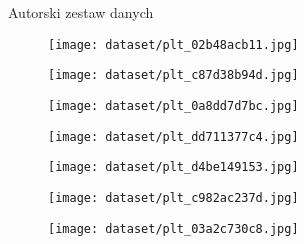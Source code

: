 \begin{easyappendix}{Autorski zestaw danych}
\begin{figure}[H]
        \centering
        \texttt{[image: dataset/plt\_02b48acb11.jpg]}
    \end{figure}
    \begin{figure}[H]
        \centering
        \texttt{[image: dataset/plt\_c87d38b94d.jpg]}
    \end{figure}
    \begin{figure}[H]
        \centering
        \texttt{[image: dataset/plt\_0a8dd7d7bc.jpg]}
    \end{figure}
    \begin{figure}[H]
        \centering
        \texttt{[image: dataset/plt\_dd711377c4.jpg]}
    \end{figure}
    \begin{figure}[H]
        \centering
        \texttt{[image: dataset/plt\_d4be149153.jpg]}
    \end{figure}
    \begin{figure}[H]
        \centering
        \texttt{[image: dataset/plt\_c982ac237d.jpg]}
    \end{figure}
    \begin{figure}[H]
        \centering
        \texttt{[image: dataset/plt\_03a2c730c8.jpg]}
    \end{figure}

\end{easyappendix}